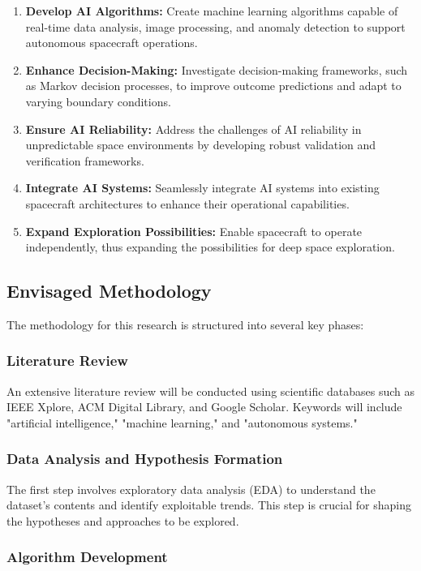 \documentclass[a4paper,12pt]{article}
\begin{document}
\begin{enumerate}
    \item \textbf{Develop AI Algorithms:} Create machine learning algorithms capable of real-time data analysis, image processing, and anomaly detection to support autonomous spacecraft operations.
    \item \textbf{Enhance Decision-Making:} Investigate decision-making frameworks, such as Markov decision processes, to improve outcome predictions and adapt to varying boundary conditions.
    \item \textbf{Ensure AI Reliability:} Address the challenges of AI reliability in unpredictable space environments by developing robust validation and verification frameworks.
    \item \textbf{Integrate AI Systems:} Seamlessly integrate AI systems into existing spacecraft architectures to enhance their operational capabilities.
    \item \textbf{Expand Exploration Possibilities:} Enable spacecraft to operate independently, thus expanding the possibilities for deep space exploration.
\end{enumerate}

\subsection{Envisaged Methodology}

The methodology for this research is structured into several key phases:

\subsubsection{Literature Review}

An extensive literature review will be conducted using scientific databases such as IEEE Xplore, ACM Digital Library, and Google Scholar. Keywords will include "artificial intelligence," "machine learning," and "autonomous systems."

\subsubsection{Data Analysis and Hypothesis Formation}

The first step involves exploratory data analysis (EDA) to understand the dataset's contents and identify exploitable trends. This step is crucial for shaping the hypotheses and approaches to be explored.

\subsubsection{Algorithm Development}
\end{document}
